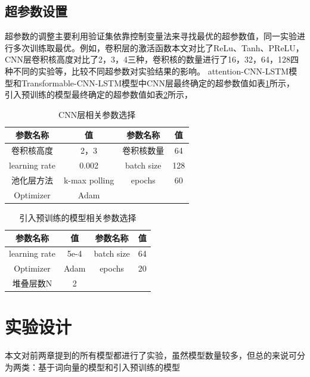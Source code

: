 \subsection{超参数设置}
超参数的调整主要利用验证集依靠控制变量法来寻找最优的超参数值，同一实验进行多次训练取最优。例如，卷积层的激活函数本文对比了ReLu、Tanh、PReLU，
CNN层卷积核高度对比了2，3，4三种，卷积核的数量进行了16，32，64，128四种不同的实验等，比较不同超参数对实验结果的影响。
attention-CNN-LSTM模型和Transformable-CNN-LSTM模型中CNN层最终确定的超参数值如表\ref{tab:cnnPara}所示，
引入预训练的模型最终确定的超参数值如表\ref{tab:bertPara}所示，

\begin{table}[htb]
  \centering
  \caption{CNN层相关参数选择}
  \label{tab:cnnPara}
\begin{tabular}{cc|cc}
\hline
参数名称&值&参数名称&值\\
\hline
卷积核高度&2，3&卷积核数量&64\\
learning rate&0.002&batch size&128\\
池化层方法&k-max polling&epochs &60\\
Optimizer&Adam&&\\
\hline
\end{tabular}
\end{table}

\begin{table}[htb]
  \centering
  \caption{引入预训练的模型相关参数选择}
  \label{tab:bertPara}
\begin{tabular}{cc|cc}
\hline
参数名称&值&参数名称&值\\
\hline
learning rate&5e-4&batch size&64\\
Optimizer&Adam&epochs &20\\
堆叠层数N&2&&\\
\hline
\end{tabular}
\end{table}

\section{实验设计}
本文对前两章提到的所有模型都进行了实验，虽然模型数量较多，但总的来说可分为两类：基于词向量的模型和引入预训练的模型
